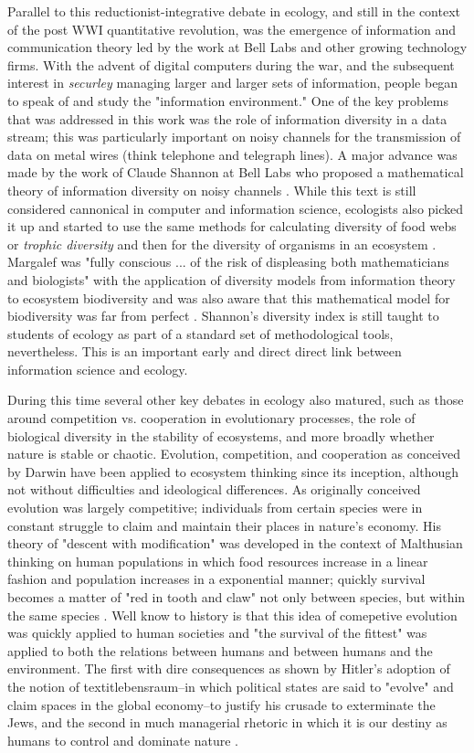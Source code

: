 Parallel to this reductionist-integrative debate in ecology, and still in the context of the post WWI quantitative revolution, was the emergence of information and communication theory led by the work at Bell Labs and other growing technology firms. With the advent of digital computers during the war, and the subsequent interest in \textit{securley} managing larger and larger sets of information, people began to speak of and study the "information environment." One of the key problems that was addressed in this work was the role of information diversity in a data stream; this was particularly important on noisy channels for the transmission of data on metal wires (think telephone and telegraph lines). A major advance was made by the work of Claude Shannon at Bell Labs who proposed a mathematical theory of information diversity on noisy channels \cite{shannon_1948}. While this text is still considered cannonical in computer and information science, ecologists also picked it up and started to use the same methods for calculating diversity of food webs or \textit{trophic diversity} \cite{macarthur_1955} and then for the diversity of organisms in an ecosystem \cite{margalef_1957}. Margalef was "fully conscious ... of the risk of displeasing both mathematicians and biologists" with the application of diversity models from information theory to ecosystem biodiversity and was also aware that this mathematical model for biodiversity was far from perfect \cite{margalef_1957}. Shannon's diversity index is still taught to students of ecology as part of a standard set of methodological tools, nevertheless. This is an important early and direct direct link between information science and ecology.

During this time several other key debates in ecology also matured, such as those around competition vs. cooperation in evolutionary processes, the role of biological diversity in the stability of ecosystems, and more broadly whether nature is stable or chaotic. Evolution, competition, and cooperation as conceived by Darwin have been applied to ecosystem thinking since its inception, although not without difficulties and ideological differences. As originally conceived evolution was largely competitive; individuals from certain species were in constant struggle to claim and maintain their places in nature's economy. His theory of "descent with modification" was developed in the context of Malthusian thinking on human populations in which food resources increase in a linear fashion and population increases in a exponential manner; quickly survival becomes a matter of "red in tooth and claw" not only between species, but within the same species \cite{stoddart_1966}. Well know to history is that this idea of comepetive evolution was quickly applied to human societies and "the survival of the fittest" was applied to both the relations between humans and between humans and the environment. The first with dire consequences as shown by Hitler's adoption of the notion of textit{lebensraum}--in which political states are said to "evolve" and claim spaces in the global economy--to justify his crusade to exterminate the Jews, and the second in much managerial rhetoric in which it is our destiny as humans to control and dominate nature \cite{stoddart_1966,worster_1977}.  

